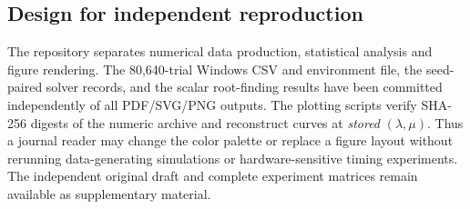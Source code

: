 \subsection{Design for independent reproduction}
The repository separates numerical data production,
statistical analysis and figure rendering. The
80,640-trial Windows CSV and environment file, the
seed-paired solver records, and the scalar root-finding
results have been committed independently of all
PDF/SVG/PNG outputs. The plotting scripts verify
SHA-256 digests of the numeric archive and reconstruct
curves at \emph{stored} $(\lambda,\mu)$.
Thus a journal reader may change the color palette or
replace a figure layout without rerunning data-generating
simulations or hardware-sensitive timing experiments.
The independent original draft and complete experiment
matrices remain available as supplementary material.
